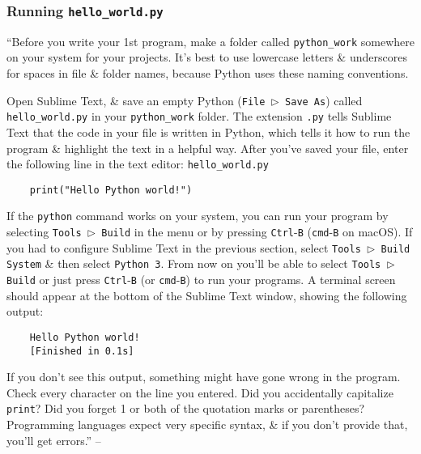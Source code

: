 \documentclass[oneside]{book}
\numberwithin{equation}{section}
\begin{document}
\subsubsection{Running \texttt{hello\_world.py}}
``Before you write your 1st program, make a folder called \verb|python_work| somewhere on your system for your projects. It's best to use lowercase letters \& underscores for spaces in file \& folder names, because Python uses these naming conventions.

Open Sublime Text, \& save an empty Python (\texttt{File $\triangleright$ Save As}) called \verb|hello_world.py| in your \verb|python_work| folder. The extension \texttt{.py} tells Sublime Text that the code in your file is written in Python, which tells it how to run the program \& highlight the text in a helpful way. After you've saved your file, enter the following line in the text editor: \verb|hello_world.py|
\begin{verbatim}
	print("Hello Python world!")
\end{verbatim}
If the \texttt{python} command works on your system, you can run your program by selecting \texttt{Tools $\triangleright$ Build} in the menu or by pressing \texttt{Ctrl}-\texttt{B} (\texttt{cmd}-\texttt{B} on macOS). If you had to configure Sublime Text in the previous section, select \texttt{Tools $\triangleright$ Build System} \& then select \texttt{Python 3}. From now on you'll be able to select \texttt{Tools $\triangleright$ Build} or just press \texttt{Ctrl}-\texttt{B} (or \texttt{cmd}-\texttt{B}) to run your programs. A terminal screen should appear at the bottom of the Sublime Text window, showing the following output:
\begin{verbatim}
	Hello Python world!
	[Finished in 0.1s]
\end{verbatim}
If you don't see this output, something might have gone wrong in the program. Check every character on the line you entered. Did you accidentally capitalize \texttt{print}? Did you forget 1 or both of the quotation marks or parentheses? Programming languages expect very specific syntax, \& if you don't provide that, you'll get errors.'' -- \cite[p. 10]{Matthes2019}
\end{document}
